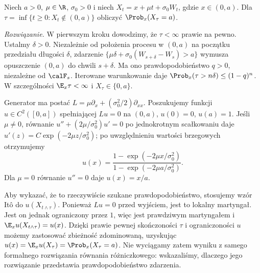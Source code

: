 \begin{zadanie}
\label{zad:exit-drift}
Niech $a>0$, $\mu\in\R$, $\sigma_0>0$ i niech
$X_t=x+\mu t+\sigma_0W_t$, gdzie $x\in(0,a)$.
Dla $\tau=\inf\{t\ge0:X_t\notin(0,a)\}$ obliczyć
$\Prob_x(X_\tau=a)$.

\emph{Rozwiązanie.} W pierwszym kroku dowodzimy, że
$\tau<\infty$ prawie na pewno. Ustalmy $\delta>0$.
Niezależnie od położenia procesu w $(0,a)$ na początku
przedziału długości $\delta$, zdarzenie
$\{\mu\delta+\sigma_0(W_{s+\delta}-W_s)>a\}$
wymusza opuszczenie $(0,a)$ do chwili $s+\delta$.
Ma ono prawdopodobieństwo $q>0$, niezależne od
$\calF_s$. Iterowane warunkowanie daje
$\Prob_x(\tau>n\delta)\le(1-q)^n$.
W szczególności $\E_x\tau<\infty$ i $X_\tau\in\{0,a\}$.

Generator ma postać $L=\mu\partial_x+
(\sigma_0^2/2)\partial_{xx}$. Poszukujemy funkcji
$u\in C^2([0,a])$ spełniającej
$Lu=0$ na $(0,a)$, $u(0)=0$, $u(a)=1$.
Jeśli $\mu\ne0$, równanie
$u''+(2\mu/\sigma_0^2)u'=0$ po jednokrotnym
scałkowaniu daje
$u'(z)=C\exp(-2\mu z/\sigma_0^2)$;
po uwzględnieniu wartości brzegowych otrzymujemy
\[
u(x)=\frac{1-\exp(-2\mu x/\sigma_0^2)}
{1-\exp(-2\mu a/\sigma_0^2)}.
\]
Dla $\mu=0$ równanie $u''=0$ daje $u(x)=x/a$.

Aby wykazać, że to rzeczywiście szukane prawdopodobieństwo,
stosujemy wzór Itô do $u(X_{t\wedge\tau})$.
Ponieważ $Lu=0$ przed wyjściem, jest to lokalny
martyngał. Jest on jednak ograniczony przez $1$,
więc jest prawdziwym martyngałem i
$\E_xu(X_{t\wedge\tau})=u(x)$.
Dzięki prawie pewnej skończoności $\tau$ i ograniczoności
$u$ możemy zastosować zbieżność zdominowaną, uzyskując
$u(x)=\E_xu(X_\tau)=\Prob_x(X_\tau=a)$.
Nie wyciągamy zatem wyniku z samego formalnego rozwiązania
równania różniczkowego: wskazaliśmy, dlaczego jego
rozwiązanie przedstawia prawdopodobieństwo zdarzenia.
\end{zadanie}

